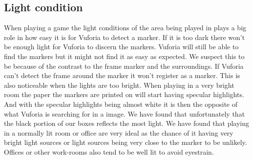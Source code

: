 \subsection{Light condition}
When playing a game the light conditions of the area being played in plays a big role in how easy it is for Vuforia to detect a marker.
If it is too dark there won't be enough light for Vuforia to discern the markers. 
Vuforia will still be able to find the markers but it might not find it as easy as expected.
We suspect this to be because of the contrast to the frame marker and the surroundings. 
If Vuforia can't detect the frame around the marker it won't register as a marker.
This is also noticeable when the lights are too bright.
When playing in a very bright room the paper the markers are printed on will start having specular highlights.
And with the specular highlights being almost white it is then the opposite of what Vuforia is searching for in a image.
We have found that unfortunately that the black portion of our boxes reflects the most light.
We have found that playing in a normally lit room or office are very ideal as the chance of it having 
very bright light sources or light sources being very close to the marker to be unlikely.
Offices or other work-rooms also tend to be well lit to avoid eyestrain.
